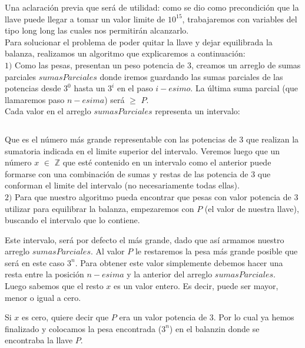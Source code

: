 Una aclaraci\'on previa que ser\'a de utilidad: como se dio como precondici\'on que la llave puede llegar a tomar un valor limite de $10^{15}$, trabajaremos con variables del tipo long long las cuales nos permitir\'an alcanzarlo.\\

Para solucionar el problema de poder quitar la llave y dejar equilibrada la balanza, realizamos un algoritmo que explicaremos a continuaci\'on:\\

$1)$ Como las pesas, presentan un peso potencia de 3, creamos un arreglo de sumas parciales $sumasParciales$ donde iremos guardando las sumas parciales de las potencias desde $3^0$ hasta un $3^i$ en el paso $i-esimo$. La última suma parcial (que llamaremos paso $n-esima$) será $\geq$ $P$.\\

Cada valor en el arreglo $sumasParciales$ representa un intervalo:

\begin{equation}
[0, \sum_{j=0}^{i}(3^j)]
\end{equation} 

Que es el número más grande representable con las potencias de 3 que realizan la sumatoria indicada en el limite superior del intervalo.
Veremos luego que un número $x$ $\in$ $\mathbb{Z}$ que esté contenido en un intervalo como el anterior puede formarse con una combinación de sumas y restas de las potencia de 3 que conforman el limite del intervalo (no necesariamente todas ellas).\\  

$2)$ Para que nuestro algoritmo pueda encontrar que pesas con valor potencia de 3 utilizar para equilibrar la balanza, empezaremos con $P$ (el valor de nuestra llave), buscando el intervalo que lo contiene. 

Este intervalo, será por defecto el más grande, dado que así armamos nuestro arreglo $sumasParciales$. 
Al valor $P$ le restaremos la pesa más grande posible que será en este caso $3^n$. Para obtener este valor simplemente debemos hacer una resta entre la posición $n-esima$ y la anterior del arreglo $sumasParciales$.\\

Luego sabemos que el resto $x$ es un valor entero. Es decir, puede ser mayor, menor o igual a cero.

Si $x$ es cero, quiere decir que $P$ era un valor potencia de 3. Por lo cual ya hemos finalizado y colocamos la pesa encontrada ($3^n$) en el balanzin donde se encontraba la llave $P$.\\

